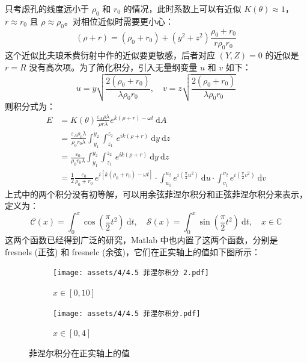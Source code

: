 \documentclass[UTF8]{report}
\def\C{\mathbb{C}}
\theoremstyle{MyLineTheoremStyle} %
\theoremstyle{MyBlockTheoremStyle} %
\theoremstyle{MySubsubsectionStyle} %
\begin{document}
只考虑孔的线度远小于 $\rho_0$ 和 $r_0$ 的情况，此时系数上可以有近似 $K(\theta) \approx 1$，$r \approx r_0$ 且 $\rho \approx \rho_0$。对相位近似时需要更小心：
\begin{equation}
(\rho + r) = (\rho_0 + r_0) + \left(y^2 + z^2\right)\frac{\rho_0 + r_0}{r\rho_0 r_0}
\end{equation}
这个近似比夫琅禾费衍射中作的近似要更敏感，后者对应 $(Y, Z) = 0$ 的近似是 $r = R$ 没有高次项。为了简化积分，引入无量纲变量 $u$ 和 $v$ 如下：
\begin{equation}
u = y \sqrt{\frac{2(\rho_0 +r_0)}{\lambda \rho_0 r_0}},\quad 
v = z \sqrt{\frac{2(\rho_0 +r_0)}{\lambda \rho_0 r_0}}
\end{equation}
则积分式为：
\begin{align}
E &= K(\theta)\frac{\varepsilon_A \rho \lambda}{\rho r \lambda} e^{k(\rho + r) - \omega t} \ \mathrm{d}A \\ &
= \frac{\varepsilon_A \rho_0 \lambda}{\rho_0r_0 \lambda} \int_{y_1}^{y_2}\int_{z_1}^{z_2} \,e^{ik(\rho + r)}\ \mathrm{d}y \ \mathrm{d}z 
\\ &
= \frac{\varepsilon_0}{\rho_0r_0 \lambda} \int_{y_1}^{y_2}\int_{z_1}^{z_2} \,e^{ik(\rho + r)}\ \mathrm{d}y \ \mathrm{d}z 
\\ &
= \frac{1}{2} \frac{\varepsilon_0}{\rho_0 + r_0}\,e^{i\left[k(\rho_0 + r_0) - \omega t\right]}\cdot \int_{u_1}^{u_2}e^{i\left(\frac{\pi}{2}u^2\right)}\ \mathrm{d}u \cdot \int_{v_1}^{v_2}e^{i\left(\frac{\pi}{2}v^2\right)}\ \mathrm{d}v
\end{align}
上式中的两个积分没有初等解，可以用余弦菲涅尔积分和正弦菲涅尔积分来表示，定义为：
\begin{equation}
\mathscr{C}(x) = \int_{0}^{x} \cos \left(\frac{\pi}{2}t^2\right)\ \mathrm{d}t,\quad
\mathscr{S}(x) = \int_{0}^{x} \sin \left(\frac{\pi}{2}t^2\right)\ \mathrm{d}t,\quad x \in \C
\end{equation}
这两个函数已经得到广泛的研究，Matlab 中也内置了这两个函数，分别是 fresnels (正弦) 和 fresnelc (余弦)，它们在正实轴上的值如下图所示：
\begin{figure}[H]\centering
\begin{subfigure}[b]{0.5\columnwidth}\centering
    \texttt{[image: assets/4/4.5 菲涅尔积分 2.pdf]}
    \caption{$x \in [0, 10]$}
\end{subfigure}\hfill
\begin{subfigure}[b]{0.5\columnwidth}\centering
    \texttt{[image: assets/4/4.5 菲涅尔积分.pdf]}
    \caption{$x \in [0, 4]$}
\end{subfigure}
\caption{菲涅尔积分在正实轴上的值}
\end{figure}
\end{document}
